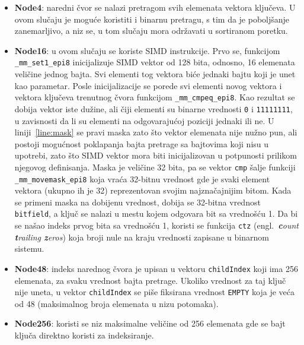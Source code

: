 \documentclass[12pt,oneside]{memoir}
\begin{document}
\begin{itemize}
  \item \textbf{Node4}: naredni čvor se nalazi pretragom svih elemenata
        vektora ključeva. U ovom slučaju je moguće koristiti i binarnu
        pretragu, s tim da je poboljšanje zanemarljivo, a niz se, u tom
        slučaju mora održavati u sortiranom poretku.
  \item \textbf{Node16}: u ovom slučaju se koriste SIMD instrukcije.
        Prvo se, funkcijom \texttt{\_mm\_set1\_epi8} inicijalizuje SIMD vektor
        od 128 bita, odnosno, 16 elemenata veličine jednog bajta. Svi
        elementi tog vektora biće jednaki bajtu koji je unet kao parametar.
        Posle inicijalizacije se porede svi elementi novog vektora i
        vektora ključeva trenutnog čvora funkcijom
        \texttt{\_mm\_cmpeq\_epi8}. Kao rezultat se dobija vektor iste
        dužine, ali čiji elementi su binarne vrednosti \texttt{0}
        i \texttt{11111111}, u zavisnosti da li su elementi na odgovarajućoj
        poziciji jednaki ili ne. U liniji~\ref{line:mask} se pravi
        maska zato što vektor elemenata nije nužno pun, ali postoji
        mogućnost poklapanja bajta pretrage sa bajtovima koji nisu
        u upotrebi, zato što SIMD vektor mora biti inicijalizovan
        u potpunosti prilikom njegovog definisanja.
        Maska je veličine
        32 bita, pa se vektor \texttt{cmp} šalje funkciji
        \texttt{\_mm\_movemask\_epi8} koja vraća 32-bitnu vrednost
        gde je svaki element vektora (ukupno ih je 32) reprezentovan
        svojim najznačajnijim bitom. Kada se primeni maska na dobijenu
        vrednost, dobija se 32-bitna vrednost \texttt{bitfield},
        a ključ se nalazi u mestu kojem odgovara bit sa vrednošću
        1. Da bi se našao indeks prvog bita sa vrednošću 1, koristi
        se funkcija \texttt{ctz}
        (engl.\ \textit{\textbf{c}ount \textbf{t}railing \textbf{z}eros})
        koja broji nule na kraju vrednosti zapisane u binarnom
        sistemu.
  \item \textbf{Node48}: indeks narednog čvora je upisan u vektoru
        \texttt{childIndex} koji ima 256 elemenata, za svaku
        vrednost bajta pretrage. Ukoliko vrednost za
        taj ključ nije uneta,
        u vektor \texttt{childIndex} se piše fiksirana
        vrednost \texttt{EMPTY} koja je veća od 48 (maksimalnog
        broja elemenata u nizu potomaka).
  \item \textbf{Node256}: koristi se niz maksimalne veličine od 256 elemenata
        gde se bajt ključa direktno koristi za indeksiranje.
\end{itemize}
\end{document}
